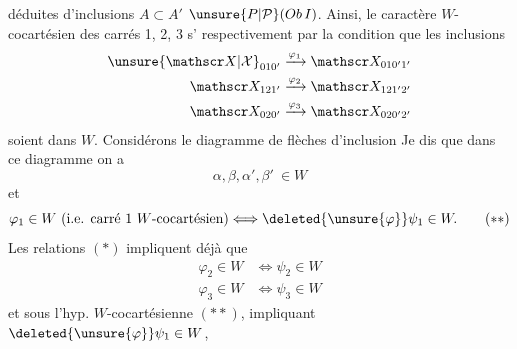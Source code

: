 
déduites d'inclusions $A\subset A'$  $\unsure{P|\mathcal P}(Ob\,I)$. Ainsi, le caractère $W$-cocartésien des carrés 1, 2, 3 s' respectivement par la condition que les inclusions
\[
 \begin{aligned}
 \unsure{\mathscr X|\mathcal X}_{010'}&\xrightarrow{\varphi_1}\mathscr X_{010'1'}\\
 \mathscr X_{121'}&\xrightarrow{\varphi_2}\mathscr X_{121'2'}\\
 \mathscr X_{020'}&\xrightarrow{\varphi_3}\mathscr X_{020'2'}
 \end{aligned}
\]
soient dans $W$. Considérons  le diagramme de flèches d'inclusion
Je dis que dans ce diagramme on a
\[
 \alpha,\beta,\alpha',\beta'\ \in W \tag*{$(*)$}
\]
et
\[
 \varphi_1\in W\ \text{(i.e. carré 1 $W$-cocartésien)}
 \Longleftrightarrow\deleted{\unsure{\varphi}}\psi_1\in W. \tag*{$(**)$}
\]
Les relations $(*)$ impliquent déjà que
\[
 \begin{aligned}
 \varphi_2\in W&\Longleftrightarrow\psi_2\in W\\
 \varphi_3\in W&\Longleftrightarrow\psi_3\in W
 \end{aligned}
\]
et sous l'hyp. $W$-cocartésienne $(**)$, impliquant $\deleted{\unsure{\varphi}}\psi_1\in W$,


